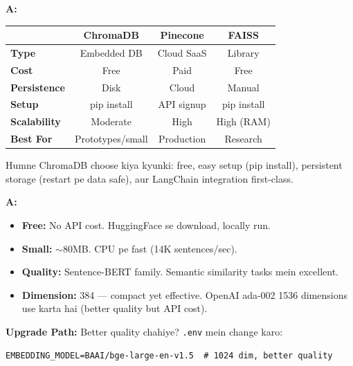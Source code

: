 \documentclass[12pt, a4paper]{article}
\begin{document}
\begin{interviewbox}[title={\faIcon{user-tie} ~Q24: ChromaDB vs Pinecone vs FAISS --- comparison?}]
\textbf{A:}
\begin{center}
\small
\begin{tabular}{|l|c|c|c|}
\hline
\rowcolor{accentpurple!15}
& \textbf{ChromaDB} & \textbf{Pinecone} & \textbf{FAISS} \\
\hline
\textbf{Type} & Embedded DB & Cloud SaaS & Library \\
\hline
\textbf{Cost} & Free & Paid & Free \\
\hline
\textbf{Persistence} & Disk & Cloud & Manual \\
\hline
\textbf{Setup} & pip install & API signup & pip install \\
\hline
\textbf{Scalability} & Moderate & High & High (RAM) \\
\hline
\textbf{Best For} & Prototypes/small & Production & Research \\
\hline
\end{tabular}
\end{center}

Humne ChromaDB choose kiya kyunki: free, easy setup (pip install), persistent storage (restart pe data safe), aur LangChain integration first-class.
\end{interviewbox}

\begin{interviewbox}[title={\faIcon{user-tie} ~Q25: Embedding model all-MiniLM-L6-v2 kyun?}]
\textbf{A:}
\begin{itemize}
\item \textbf{Free:} No API cost. HuggingFace se download, locally run.
\item \textbf{Small:} $\sim$80MB. CPU pe fast (14K sentences/sec).
\item \textbf{Quality:} Sentence-BERT family. Semantic similarity tasks mein excellent.
\item \textbf{Dimension:} 384 --- compact yet effective. OpenAI ada-002 1536 dimensions use karta hai (better quality but API cost).
\end{itemize}

\textbf{Upgrade Path:} Better quality chahiye? \texttt{.env} mein change karo:
\begin{lstlisting}[style=envstyle]
EMBEDDING_MODEL=BAAI/bge-large-en-v1.5  # 1024 dim, better quality
\end{lstlisting}
\end{interviewbox}
\end{document}
